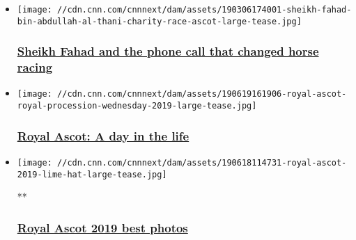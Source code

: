 \begin{itemize}
\item
  \href{/2019/08/12/sport/qatar-racing-david-redvers-spt-intl/index.html}{}

  \texttt{[image: //cdn.cnn.com/cnnnext/dam/assets/190306174001-sheikh-fahad-bin-abdullah-al-thani-charity-race-ascot-large-tease.jpg]}

  \hypertarget{sheikh-fahad-and-the-phone-call-that-changed-horse-racing}{%
  \subsubsection{\texorpdfstring{\href{/2019/08/12/sport/qatar-racing-david-redvers-spt-intl/index.html}{Sheikh
  Fahad and the phone call that changed horse
  racing}}{Sheikh Fahad and the phone call that changed horse racing}}\label{sheikh-fahad-and-the-phone-call-that-changed-horse-racing}}
\end{itemize}

\begin{itemize}
\item
  \href{/2019/06/19/sport/royal-ascot-day-in-life-2019-people/index.html}{}

  \texttt{[image: //cdn.cnn.com/cnnnext/dam/assets/190619161906-royal-ascot-royal-procession-wednesday-2019-large-tease.jpg]}

  \hypertarget{royal-ascot-a-day-in-the-life-}{%
  \subsubsection{\texorpdfstring{\href{/2019/06/19/sport/royal-ascot-day-in-life-2019-people/index.html}{Royal
  Ascot: A day in the life
  }}{Royal Ascot: A day in the life }}\label{royal-ascot-a-day-in-the-life-}}
\end{itemize}

\begin{itemize}
\item
  \href{/2019/06/18/sport/gallery/royal-ascot-2019-best-photos/index.html}{}

  \texttt{[image: //cdn.cnn.com/cnnnext/dam/assets/190618114731-royal-ascot-2019-lime-hat-large-tease.jpg]}

  **

  \hypertarget{royal-ascot-2019-best-photos}{%
  \subsubsection{\texorpdfstring{\href{/2019/06/18/sport/gallery/royal-ascot-2019-best-photos/index.html}{Royal
  Ascot 2019 best
  photos}}{Royal Ascot 2019 best photos}}\label{royal-ascot-2019-best-photos}}
\end{itemize}


